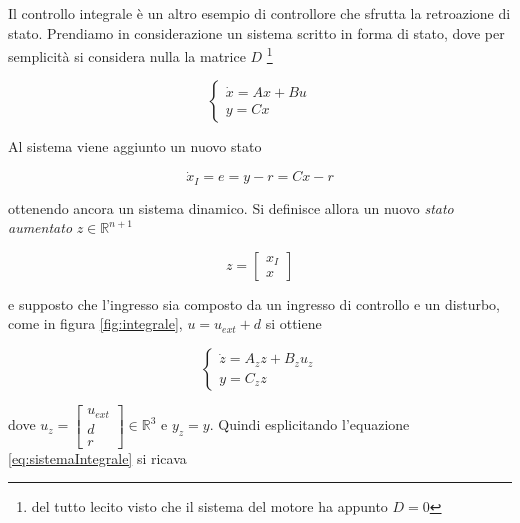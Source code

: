 		\noindent Il controllo integrale è un altro esempio di controllore che sfrutta la retroazione di stato. Prendiamo in considerazione un sistema scritto in forma di stato, dove per semplicità si considera nulla la matrice $D$ \footnote{del tutto lecito visto che il sistema del motore ha appunto $D=0$}
		
		\begin{equation}
			\begin{cases}
				\dot{x}=Ax+Bu \\
				y=Cx
			\end{cases}
			\label{eq:sistemaNoD}
		\end{equation}
	
		\noindent Al sistema viene aggiunto un nuovo stato
		
		\begin{equation}
			\dot{x}_I=e=y-r=Cx-r
			\label{eq:NuovoStato}
		\end{equation}
	
		\noindent ottenendo ancora un sistema dinamico. Si definisce allora un nuovo \textit{stato aumentato} $z \in \mathbb{R}^{n+1}$
		
		\begin{equation}
			z=
			\begin{bmatrix}
				x_I \\
				x
			\end{bmatrix}
			\label{eq:statoAumentato}
		\end{equation}
	
		\noindent e supposto che l'ingresso sia composto da un ingresso di controllo e un disturbo, come in figura \ref{fig:integrale}, $u=u_{ext}+d$ si ottiene
		
		\begin{equation}
			\begin{cases}
				\dot{z}=A_zz+B_zu_z \\
				y=C_zz
			\end{cases}
			\label{eq:sistemaIntegrale}
		\end{equation}
		
		\noindent dove $u_z = \begin{bmatrix} u_{ext} \\ d \\ r \end{bmatrix} \in \mathbb{R}^3$ e $y_z=y$. Quindi esplicitando l'equazione \ref{eq:sistemaIntegrale} si ricava
		
